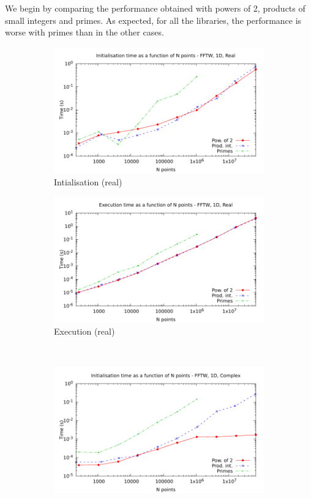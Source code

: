 \documentclass[12pt, a4paper]{article}
\begin{document}
We begin by comparing the performance obtained with powers of 2, products of small integers and primes. As expected, for all the libraries, the performance is worse with primes than in the other cases. 
\begin{figure}[H]
\captionsetup{width=0.8\linewidth}
\centering
\begin{subfigure}{.5\textwidth}
\centering
\includegraphics[width=.9\linewidth]{graphs/1d-fftw-init-r.pdf}
\caption{Intialisation (real)}
\label{1DFFTWRI}
\end{subfigure}%
\begin{subfigure}{.5\textwidth}
\centering
\includegraphics[width=.9\linewidth]{graphs/1d-fftw-exec-r.pdf}
\caption{Execution (real)}
\label{1DFFTWR}
\end{subfigure}\\
\begin{subfigure}{.5\textwidth}
\centering
\includegraphics[width=.9\linewidth]{graphs/1d-fftw-init-c.pdf}

\end{subfigure}
\end{figure}
\end{document}
